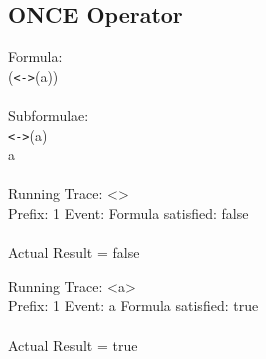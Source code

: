 \subsection{ONCE Operator}

Formula:\\
(\texttt{\textless -\textgreater}(a))\\
\\
Subformulae:\\
\texttt{\textless -\textgreater}(a)\\
a\\
\\
Running Trace: \textless \textgreater\\
  Prefix: 1 Event:  Formula satisfied: false\\
\\
Actual Result = false\\

\newpage

\noindent Running Trace: \textless a\textgreater\\
  Prefix: 1 Event: a Formula satisfied: true\\
\\
Actual Result = true\\


